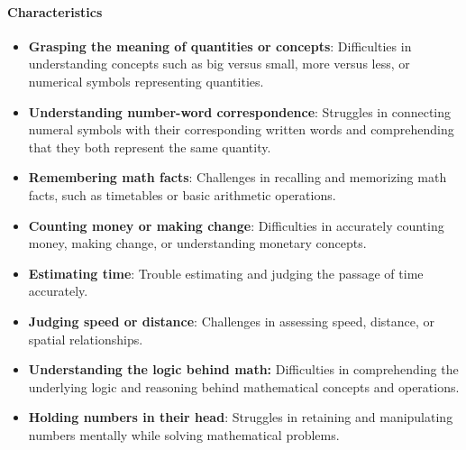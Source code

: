 \paragraph{Characteristics}
\begin{itemize}
    \item \textbf{Grasping the meaning of quantities or concepts}: Difficulties in understanding concepts such as big versus small, more versus less, or numerical symbols representing quantities.
    \item \textbf{Understanding number-word correspondence}: Struggles in connecting numeral symbols with their corresponding written words and comprehending that they both represent the same quantity.
    \item \textbf{Remembering math facts}: Challenges in recalling and memorizing math facts, such as timetables or basic arithmetic operations.
    \item \textbf{Counting money or making change}: Difficulties in accurately counting money, making change, or understanding monetary concepts.
    \item \textbf{Estimating time}: Trouble estimating and judging the passage of time accurately.
    \item \textbf{Judging speed or distance}: Challenges in assessing speed, distance, or spatial relationships.
    \item \textbf{Understanding the logic behind math:} Difficulties in comprehending the underlying logic and reasoning behind mathematical concepts and operations.
    \item \textbf{Holding numbers in their head}: Struggles in retaining and manipulating numbers mentally while solving mathematical problems.
\end{itemize}


